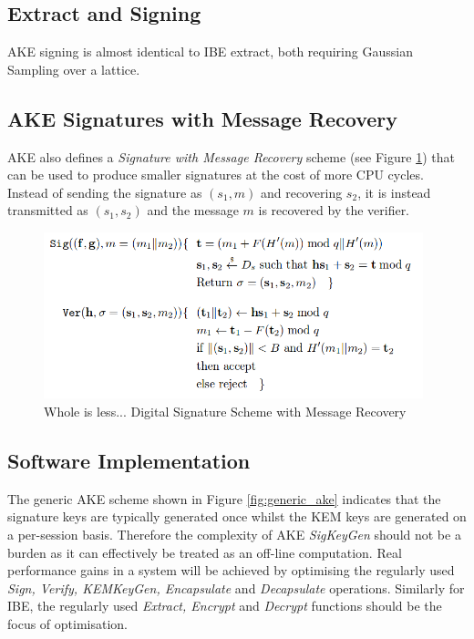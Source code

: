 \subsection{Extract and Signing}

AKE signing is almost identical to IBE extract, both requiring Gaussian Sampling over a lattice.

\subsection{AKE Signatures with Message Recovery}

AKE also defines a \textit{Signature with Message Recovery} scheme (see Figure \ref {fig:ake_signature_with_recovery}) that can be used to produce smaller signatures at the cost of more CPU cycles. Instead of sending the signature as $(s_1, m)$ and recovering $s_2$, it is instead transmitted as $(s_1, s_2)$ and the message $m$ is recovered by the verifier.

\begin{figure}[H]
\centering
\includegraphics[width=11cm]{ake_with_message_recovery.png}
\caption{Whole is less... Digital Signature Scheme with Message Recovery}
\label{fig:ake_signature_with_recovery}
\end{figure}


\subsection{Software Implementation}

The generic AKE scheme shown in Figure \ref{fig:generic_ake} indicates that the signature keys are typically generated once whilst the KEM keys are generated on a per-session basis. Therefore the complexity of AKE \textit{SigKeyGen} should not be a burden as it can effectively be treated as an off-line computation. Real performance gains in a system will be achieved by optimising the regularly used \textit{Sign, Verify, KEMKeyGen, Encapsulate} and \textit{Decapsulate} operations. Similarly for IBE, the regularly used \textit{Extract, Encrypt} and \textit{Decrypt} functions should be the focus of optimisation.

